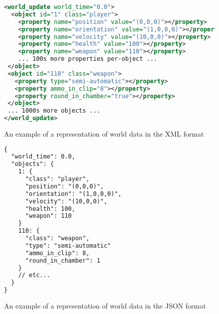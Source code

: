 \newpage
\begin{figure}[!ht]
\begin{lstlisting}[language=xml]
<world_update world_time="0.0">
  <object id="1" class="player">
    <property name="position" value="(0,0,0)"></property>
    <property name="orientation" value="(1,0,0,0)"></property>
    <property name="velocity" value="(10,0,0)"></property>
    <property name="health" value="100"></property>
    <property name="weapon" value="110"></property>
    ... 100s more properties per-object ...
 </object>
 <object id="110" class="weapon">
   <property type="semi-automatic"></property>
   <property ammo_in_clip="8"></property>
   <property round_in_chamber="true"></property>
 </object>
 ... 1000s more objects ...
</world_update>
\end{lstlisting}

\caption{An example of a representation of world data in the XML format}
\label{fig:xml-example}
\end{figure}

\begin{figure}[!ht]
\begin{lstlisting}[language=xml]
{
  "world_time": 0.0,
  "objects": {
    1: {
      "class": "player",
      "position": "(0,0,0)",
      "orientation": "(1,0,0,0)",
      "velocity": "(10,0,0)",
      "health": 100,
      "weapon": 110
    }
    110: {
      "class": "weapon",
      "type": "semi-automatic"
      "ammo_in_clip": 8,
      "round_in_chamber": 1
    }
    // etc...
  }
}
\end{lstlisting}

\caption{An example of a representation of world data in the JSON format}
\label{fig:json-example}
\end{figure}
\newpage

